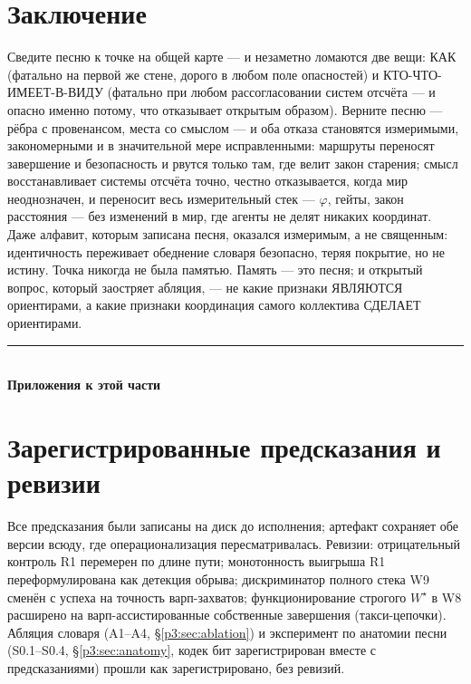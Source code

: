 \documentclass{article}
\newcommand{\wstar}{W^{\star}}
\begin{document}
\section{Заключение}

Сведите песню к точке на общей карте --- и незаметно ломаются две
вещи: КАК (фатально на первой же стене, дорого в любом поле
опасностей) и КТО-ЧТО-ИМЕЕТ-В-ВИДУ (фатально при любом рассогласовании
систем отсчёта --- и опасно именно потому, что отказывает открытым
образом). Верните песню --- рёбра с провенансом, места со смыслом ---
и оба отказа становятся измеримыми, закономерными и в значительной
мере исправленными: маршруты переносят завершение и безопасность и
рвутся только там, где велит закон старения; смысл восстанавливает
системы отсчёта точно, честно отказывается, когда мир неоднозначен, и
переносит весь измерительный стек --- $\varphi$, гейты, закон
расстояния --- без изменений в мир, где агенты не делят никаких
координат. Даже алфавит, которым записана песня, оказался измеримым,
а не священным: идентичность переживает обеднение словаря безопасно,
теряя покрытие, но не истину. Точка никогда не была памятью. Память
--- это песня; и открытый вопрос, который заостряет абляция, --- не
какие признаки ЯВЛЯЮТСЯ ориентирами, а какие признаки координация
самого коллектива СДЕЛАЕТ ориентирами.

\FloatBarrier
\begin{center}\rule{0.55\linewidth}{0.4pt}\\[2pt]\textbf{Приложения к этой части}\end{center}


\section{Зарегистрированные предсказания и ревизии}
\label{p3:app:registered}
Все предсказания были записаны на диск до исполнения; артефакт
сохраняет обе версии всюду, где операционализация пересматривалась.
Ревизии: отрицательный контроль R1 перемерен по длине пути;
монотонность выигрыша R1 переформулирована как детекция обрыва;
дискриминатор полного стека W9 сменён с успеха на точность
варп-захватов; функционирование строгого $\wstar$ в W8 расширено на
варп-ассистированные собственные завершения (такси-цепочки). Абляция
словаря (A1--A4, \S\ref{p3:sec:ablation}) и эксперимент по анатомии песни
(S0.1--S0.4, \S\ref{p3:sec:anatomy}, кодек бит зарегистрирован вместе с
предсказаниями) прошли как зарегистрировано, без ревизий.
\end{document}
